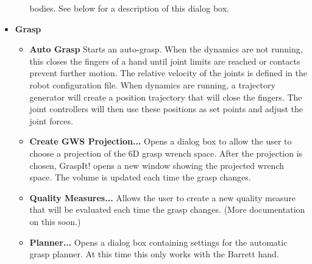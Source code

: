 \begin{itemize}
\begin{itemize}
  bodies. See below for a description of this dialog box.
\end{itemize}
\item \textbf{Grasp}
\begin{itemize}
\item \textbf{Auto Grasp} Starts an auto-grasp. When the dynamics are
  not running, this closes the fingers of a hand until joint limits
  are reached or contacts prevent further motion. The relative
  velocity of the joints is defined in the robot configuration
  file. When dynamics are running, a trajectory generator will create
  a position trajectory that will close the fingers. The joint
  controllers will then use these positions as set points and adjust
  the joint forces.
\item \textbf{Create GWS Projection...}  Opens a dialog box to allow
  the user to choose a projection of the 6D grasp wrench space. After
  the projection is chosen, GraspIt! opens a new window showing the
  projected wrench space. The volume is updated each time the grasp
  changes.
\item \textbf{Quality Measures...}  Allows the user to create a new
  quality measure that will be evaluated each time the grasp
  changes. (More documentation on this soon.)
\item \textbf{Planner...}  Opens a dialog box containing settings for
  the automatic grasp planner. At this time this only works with the
  Barrett hand.
\end{itemize}
\end{itemize}
